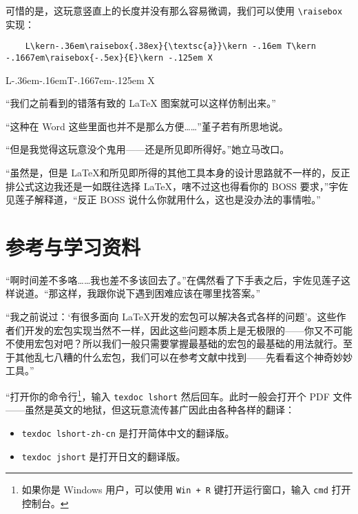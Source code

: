 可惜的是，这玩意竖直上的长度并没有那么容易微调，我们可以使用 \verb"\raisebox" 实现：


\begin{lstlisting}
    L\kern-.36em\raisebox{.38ex}{\textsc{a}}\kern -.16em T\kern -.1667em\raisebox{-.5ex}{E}\kern -.125em X
\end{lstlisting}



\begin{center}
    L\kern-.36em\kern-.16emT\kern -.1667em\raisebox{-.5ex}{E}\kern -.125em X
\end{center}


“我们之前看到的错落有致的 \LaTeX{} 图案就可以这样仿制出来。”

“这种在 Word 这些里面也并不是那么方便……”堇子若有所思地说。

“但是我觉得这玩意没个鬼用——还是所见即所得好。”她立马改口。

“虽然是，但是 \LaTeX 和所见即所得的其他工具本身的设计思路就不一样的，反正排公式这边我还是一如既往选择 \LaTeX，嗐不过这也得看你的 BOSS 要求，”宇佐见莲子解释道，“反正 BOSS 说什么你就用什么，这也是没办法的事情啦。”

\section{参考与学习资料}

“啊时间差不多咯……我也差不多该回去了。”在偶然看了下手表之后，宇佐见莲子这样说道。“那这样，我跟你说下遇到困难应该在哪里找答案。”

“我之前说过：‘有很多面向 \LaTeX 开发的宏包可以解决各式各样的问题’。这些作者们开发的宏包实现当然不一样，因此这些问题本质上是无极限的——你又不可能不使用宏包对吧？所以我们一般只需要掌握最基础的宏包的最基础的用法就行。至于其他乱七八糟的什么宏包，我们可以在参考文献中找到——先看看这个神奇妙妙工具。”

“打开你的命令行\footnote{如果你是 Windows 用户，可以使用 \texttt{Win + R} 键打开运行窗口，输入 \texttt{cmd} 打开控制台。}，输入 \verb"texdoc lshort" 然后回车。此时一般会打开个 PDF 文件 \textcite[LShort]{oetiker2003not}
——虽然是英文的地狱，但这玩意流传甚广因此由各种各样的翻译：

\begin{itemize}
    \item  \verb"texdoc lshort-zh-cn" 是打开简体中文的翻译版。
    \item  \verb"texdoc jshort" 是打开日文的翻译版。
\end{itemize}

